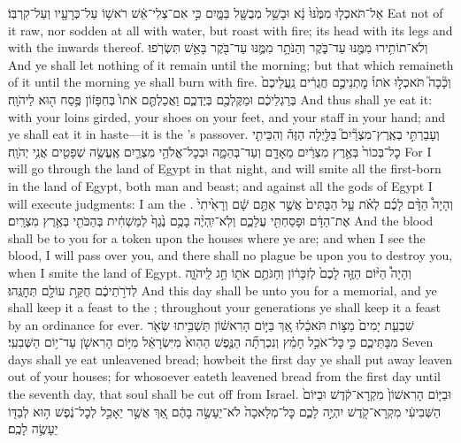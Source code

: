 \documentclass[11pt, openany]{book}
\begin{document}
{אַל־תֹּאכְל֤וּ מִמֶּ֙נּוּ֙ נָ֔א וּבָשֵׁ֥ל מְבֻשָּׁ֖ל בַּמָּ֑יִם כִּ֣י אִם־צְלִי־אֵ֔שׁ רֹאשׁ֥וֹ עַל־כְּרָעָ֖יו וְעַל־קִרְבּֽוֹ׃}
{Eat not of it raw, nor sodden at all with water, but roast with fire; its head with its legs and with the inwards thereof.}
{וְלֹא־תוֹתִ֥ירוּ מִמֶּ֖נּוּ עַד־בֹּ֑קֶר וְהַנֹּתָ֥ר מִמֶּ֛נּוּ עַד־בֹּ֖קֶר בָּאֵ֥שׁ תִּשְׂרֹֽפוּ׃}
{And ye shall let nothing of it remain until the morning; but that which remaineth of it until the morning ye shall burn with fire.}
{וְכָ֘כָה֮ תֹּאכְל֣וּ אֹתוֹ֒ מׇתְנֵיכֶ֣ם חֲגֻרִ֔ים נַֽעֲלֵיכֶם֙ בְּרַגְלֵיכֶ֔ם וּמַקֶּלְכֶ֖ם בְּיֶדְכֶ֑ם וַאֲכַלְתֶּ֤ם אֹתוֹ֙ בְּחִפָּז֔וֹן פֶּ֥סַח ה֖וּא לַיהֹוָֽה׃}
{And thus shall ye eat it: with your loins girded, your shoes on your feet, and your staff in your hand; and ye shall eat it in haste—it is the \lord’s passover.}
{וְעָבַרְתִּ֣י בְאֶֽרֶץ־מִצְרַ֘יִם֮ בַּלַּ֣יְלָה הַזֶּה֒ וְהִכֵּיתִ֤י כׇל־בְּכוֹר֙ בְּאֶ֣רֶץ מִצְרַ֔יִם מֵאָדָ֖ם וְעַד־בְּהֵמָ֑ה וּבְכׇל־אֱלֹהֵ֥י מִצְרַ֛יִם אֶֽעֱשֶׂ֥ה שְׁפָטִ֖ים אֲנִ֥י יְהֹוָֽה׃}
{For I will go through the land of Egypt in that night, and will smite all the first-born in the land of Egypt, both man and beast; and against all the gods of Egypt I will execute judgments: I am the \lord.}
{וְהָיָה֩ הַדָּ֨ם לָכֶ֜ם לְאֹ֗ת עַ֤ל הַבָּתִּים֙ אֲשֶׁ֣ר אַתֶּ֣ם שָׁ֔ם וְרָאִ֙יתִי֙ אֶת־הַדָּ֔ם וּפָסַחְתִּ֖י עֲלֵכֶ֑ם וְלֹֽא־יִֽהְיֶ֨ה בָכֶ֥ם נֶ֙גֶף֙ לְמַשְׁחִ֔ית בְּהַכֹּתִ֖י בְּאֶ֥רֶץ מִצְרָֽיִם׃}
{And the blood shall be to you for a token upon the houses where ye are; and when I see the blood, I will pass over you, and there shall no plague be upon you to destroy you, when I smite the land of Egypt.}
{וְהָיָה֩ הַיּ֨וֹם הַזֶּ֤ה לָכֶם֙ לְזִכָּר֔וֹן וְחַגֹּתֶ֥ם אֹת֖וֹ חַ֣ג לַֽיהֹוָ֑ה לְדֹרֹ֣תֵיכֶ֔ם חֻקַּ֥ת עוֹלָ֖ם תְּחׇגֻּֽהוּ׃}
{And this day shall be unto you for a memorial, and ye shall keep it a feast to the \lord; throughout your generations ye shall keep it a feast by an ordinance for ever.}
{שִׁבְעַ֤ת יָמִים֙ מַצּ֣וֹת תֹּאכֵ֔לוּ אַ֚ךְ בַּיּ֣וֹם הָרִאשׁ֔וֹן תַּשְׁבִּ֥יתוּ שְּׂאֹ֖ר מִבָּתֵּיכֶ֑ם כִּ֣י \legarmeh  כׇּל־אֹכֵ֣ל חָמֵ֗ץ וְנִכְרְתָ֞ה הַנֶּ֤פֶשׁ הַהִוא֙ מִיִּשְׂרָאֵ֔ל מִיּ֥וֹם הָרִאשֹׁ֖ן עַד־י֥וֹם הַשְּׁבִעִֽי׃}
{Seven days shall ye eat unleavened bread; howbeit the first day ye shall put away leaven out of your houses; for whosoever eateth leavened bread from the first day until the seventh day, that soul shall be cut off from Israel.}
{וּבַיּ֤וֹם הָרִאשׁוֹן֙ מִקְרָא־קֹ֔דֶשׁ וּבַיּוֹם֙ הַשְּׁבִיעִ֔י מִקְרָא־קֹ֖דֶשׁ יִהְיֶ֣ה לָכֶ֑ם כׇּל־מְלָאכָה֙ לֹא־יֵעָשֶׂ֣ה בָהֶ֔ם אַ֚ךְ אֲשֶׁ֣ר יֵאָכֵ֣ל לְכׇל־נֶ֔פֶשׁ ה֥וּא לְבַדּ֖וֹ יֵעָשֶׂ֥ה לָכֶֽם׃}
\end{document}
